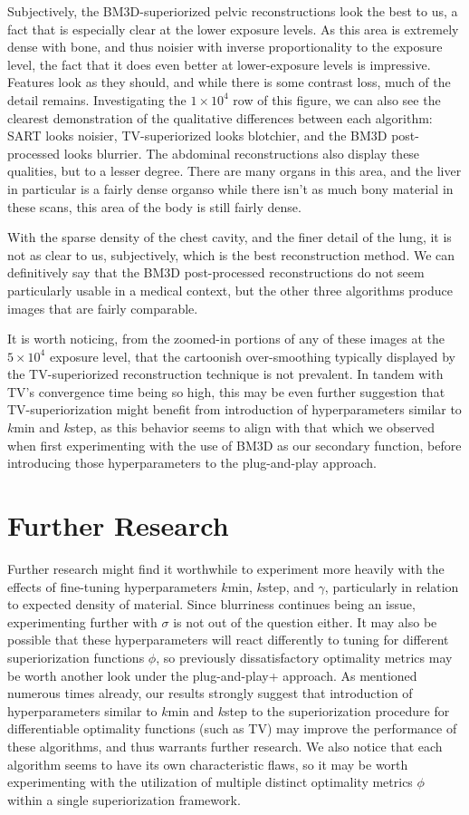 \documentclass[sigconf,twocolumn,nonacm=true]{acmart}
\newcommand{\tighten}{\vspace*{-6pt plus -2pt minus -2pt}} %
\newcommand{\emd}{\text{\textemdash}} %
\newcommand{\e}[1]{\times10^{#1}} %
\begin{document}
Subjectively, the BM3D-superiorized pelvic reconstructions look the best to us, a fact that is especially clear at the lower exposure levels. As this area is extremely dense with bone, and thus noisier with inverse proportionality to the exposure level, the fact that it does even better at lower-exposure levels is impressive. Features look as they should, and while there is some contrast loss, much of the detail remains. Investigating the $1\e{4}$ row of this figure, we can also see the clearest demonstration of the qualitative differences between each algorithm: SART looks noisier, TV-superiorized looks blotchier, and the BM3D post-processed looks blurrier. The abdominal reconstructions also display these qualities, but to a lesser degree. There are many organs in this area, and the liver in particular is a fairly dense organ\emd so while there isn't as much bony material in these scans, this area of the body is still fairly dense.

With the sparse density of the chest cavity, and the finer detail of the lung, it is not as clear to us, subjectively, which is the best reconstruction method. We can definitively say that the BM3D post-processed reconstructions do not seem particularly usable in a medical context, but the other three algorithms produce images that are fairly comparable.

It is worth noticing, from the zoomed-in portions of any of these images at the $5\e{4}$ exposure level, that the cartoonish over-smoothing typically displayed by the TV-superiorized reconstruction technique is not prevalent. In tandem with TV's convergence time being so high, this may be even further suggestion that TV-superiorization might benefit from introduction of hyperparameters similar to $k$min and $k$step, as this behavior seems to align with that which we observed when first experimenting with the use of BM3D as our secondary function, before introducing those hyperparameters to the plug-and-play approach.

\medskip
\section{Further Research}\tighten
Further research might find it worthwhile to experiment more heavily with the effects of fine-tuning hyperparameters $k$min, $k$step, and $\gamma$, particularly in relation to expected density of material. Since blurriness continues being an issue, experimenting further with $\sigma$ is not out of the question either. It may also be possible that these hyperparameters will react differently to tuning for different superiorization functions $\phi$, so previously dissatisfactory optimality metrics may be worth another look under the plug-and-play+ approach. As mentioned numerous times already, our results strongly suggest that introduction of hyperparameters similar to $k$min and $k$step to the superiorization procedure for differentiable optimality functions (such as TV) may improve the performance of these algorithms, and thus warrants further research. We also notice that each algorithm seems to have its own characteristic flaws, so it may be worth experimenting with the utilization of multiple distinct optimality metrics $\phi$ within a single superiorization framework.
\end{document}
